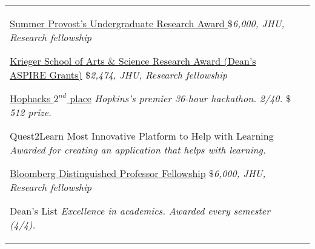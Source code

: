 \documentclass[10pt]{article} %
\begin{document}




	
\begin{supertabular}{L{4cm}@{\hskip 0.3in}L{13cm}}
{\href{https://hour.jhu.edu/opportunities/summerpura/}{Summer Provost’s Undergraduate Research Award }} %
{\textit{$\$$6,000, JHU, Research fellowship}} %

{\href{https://krieger.jhu.edu/ursca/projects/aspire-grant/}{Krieger School of Arts \& Science Research Award (Dean's ASPIRE Grants)}} %
{\textit{$\$$2,474, JHU, Research fellowship}} %

{\href{https://hophacks.com/}{Hophacks $2^{nd}$ place}} %
{\textit{Hopkins's premier 36-hour hackathon. 2/40. $\$$512 prize.}} %

{Quest2Learn Most Innovative Platform to Help with Learning }
{\textit{Awarded for creating an application that helps with learning.}}


{\href{https://hour.jhu.edu/opportunities/bdpsp/}{Bloomberg Distinguished Professor Fellowship}}
{\textit{$\$$6,000, JHU, Research fellowship}}

{Dean's List}
{\textit{Excellence in academics. Awarded every semester (4/4).}}
\end{supertabular}

	
	
\end{document}
